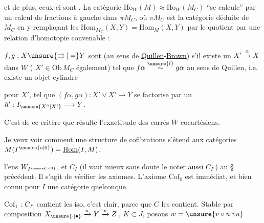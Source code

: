 
et de plus, ceux-ci sont \uline{}. La catégorie $\mathrm{Ho}_W(M)\approx\mathrm{Ho}_W(M_C)$ ``se calcule'' par un calcul de fractions à gauche dans $\pi M_C$, où $\pi M_C$ est la catégorie déduite de $M_C$ en y remplaçant les $\mathrm{Hom}_{M_C}(X,Y)=\mathrm{Hom}_M(X,Y)$ par le quotient par une relation d'homotopie convenable :

$f,g:X\unsure{\rightrightarrows|=}Y$ sont  (au sens de \uline{Quillen}-\uline{Brown}) s'il existe un $X'\xrightarrow{\alpha}X$ dans $W$ ( $X'\in\mathrm{Ob}\,M_C$ également) tel que $f\alpha\overset{\unsure{l}}{\sim}g\alpha$ au sens de Quillen, i.e. existe un objet-cylindre


pour $X'$, tel que $(f\alpha,g\alpha):X'\vee X'\longrightarrow Y$ se factorise par un $h':I_{\unsure{X''|X'}}\longrightarrow Y$.

C'est de ce critère que résulte l'exactitude  des carrés $W$-cocartésiens.

Je veux voir comment une structure de cofibrations s'étend aux catégories $M(I^{\unsure{\circ|0}})=\underline{\mathrm{Hom}}(I,M)$.  

 l'ens $W_{I^{\unsure{\circ|0}}}$, et $C_I$ (il vaut mieux sans doute le noter aussi $C_{I^\circ}$)  au \S{} précédent. Il s'agit de vérifier les axiomes. L'axiome $\mathrm{Cof}_0$ est immédiat, et bien connu pour $I$ une catégorie quelconque.

$\mathrm{Cof}_1$ : $C_{I^\circ}$ contient les iso, c'est clair, parce que $C$ les contient. Stable par composition $X_{\unsure{\cdot|\bullet}}\xrightarrow{u}Y_{\cdot}\xrightarrow{v}Z_{\cdot}$,  $K\subset J$, posons $w=\unsure{v\circ u|vu}$


